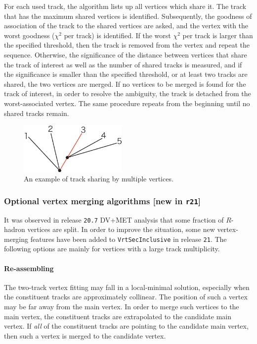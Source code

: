 For each used track, the algorithm lists up all vertices which share it. The track that has the maximum shared vertices is identified. Subsequently, the goodness of association of the track to the shared vertices are asked, and the vertex with the worst goodness ($\chi^{2}$ per track) is identified. If the worst $\chi^{2}$ per track is larger than the specified threshold, then the track is removed from the vertex and repeat the sequence. Otherwise, the significance of the distance between vertices that share the track of interest as well as the number of shared tracks is measured, and if the significance is smaller than the specified threshold, or at least two tracks are shared, the two vertices are merged. If no vertices to be merged is found for the track of interest, in order to resolve the ambiguity, the track is detached from the worst-associated vertex. The same procedure repeats from the beginning until no shared tracks remain.

\begin{figure}[t]
\begin{center}
\includegraphics[width=0.47\textwidth]{figures/rearrange}
\caption{An example of track sharing by multiple vertices.}
\label{fig:rearrange}
\end{center}
\end{figure}

\subsubsection{Optional vertex merging algorithms [new in {\tt r21}]}\label{sec:merging}
It was observed in release {\tt 20.7} DV+MET analysis that some fraction of $R$-hadron vertices are split. In order to improve the situation, some new vertex-merging features have been added to {\tt VrtSecInclusive} in release {\tt 21}. The following options are mainly for vertices with a large track multiplicity.

\paragraph{Re-assembling}
The two-track vertex fitting may fall in a local-minimal solution, especially when the constituent tracks are approximately collinear. The position of such a vertex may be far away from the main vertex. In order to merge such vertices to the main vertex, the constituent tracks are extrapolated to the candidate main vertex. If \emph{all} of the constituent tracks are pointing to the candidate main vertex, then such a vertex is merged to the candidate vertex.

